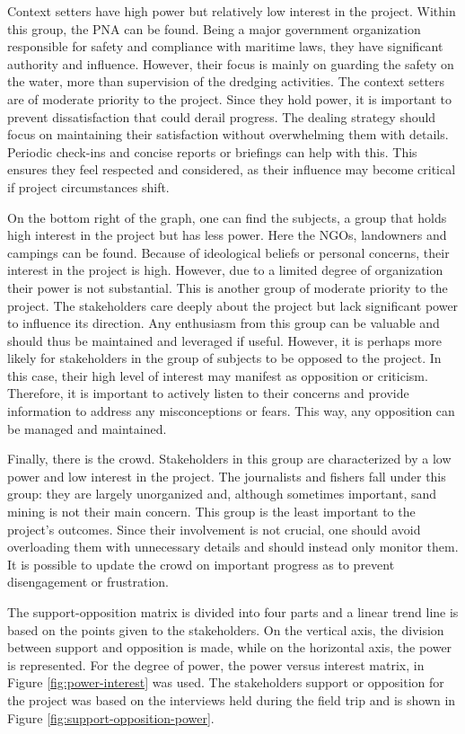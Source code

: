 Context setters have high power but relatively low interest in the project. Within this group, the PNA can be found. Being a major government organization responsible for safety and compliance with maritime laws, they have significant authority and influence. However, their focus is mainly on guarding the safety on the water, more than supervision of the dredging activities. The context setters are of moderate priority to the project. Since they hold power, it is important to prevent dissatisfaction that could derail progress. The dealing strategy should focus on maintaining their satisfaction without overwhelming them with details. Periodic check-ins and concise reports or briefings can help with this. This ensures they feel respected and considered, as their influence may become critical if project circumstances shift.

On the bottom right of the graph, one can find the subjects, a group that holds high interest in the project but has less power. Here the NGOs, landowners and campings can be found. Because of ideological beliefs or personal concerns, their interest in the project is high. However, due to a limited degree of organization their power is not substantial. This is another group of moderate priority to the project. The stakeholders care deeply about the project but lack significant power to influence its direction. Any enthusiasm from this group can be valuable and should thus be maintained and leveraged if useful. However, it is perhaps more likely for stakeholders in the group of subjects to be opposed to the project. In this case, their high level of interest may manifest as opposition or criticism. Therefore, it is important to actively listen to their concerns and provide information to address any misconceptions or fears. This way, any opposition can be managed and maintained.

Finally, there is the crowd. Stakeholders in this group are characterized by a low power and low interest in the project. The journalists and fishers fall under this group: they are largely unorganized and, although sometimes important, sand mining is not their main concern. This group is the least important to the project's outcomes. Since their involvement is not crucial, one should avoid overloading them with unnecessary details and should instead only monitor them. It is possible to update the crowd on important progress as to prevent disengagement or frustration.

The support-opposition matrix is divided into four parts and a linear trend line is based on the points given to the stakeholders. On the vertical axis, the division between support and opposition is made, while on the horizontal axis, the power is represented. For the degree of power, the power versus interest matrix, in Figure \ref{fig:power-interest} was used. The stakeholders support or opposition for the project was based on the interviews held during the field trip and is shown in Figure \ref{fig:support-opposition-power}.

